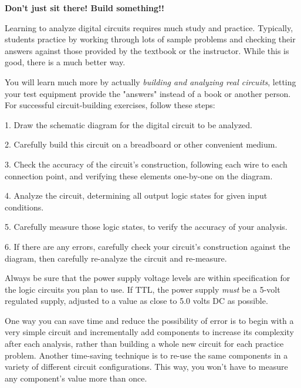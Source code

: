 

\centerline{\bf Don't just sit there!  Build something!!}

\vskip 10pt

Learning to analyze digital circuits requires much study and practice.  Typically, students practice by working through lots of sample problems and checking their answers against those provided by the textbook or the instructor.  While this is good, there is a much better way.

You will learn much more by actually {\it building and analyzing real circuits}, letting your test equipment provide the "answers" instead of a book or another person.  For successful circuit-building exercises, follow these steps:

\medskip
\item{1.} Draw the schematic diagram for the digital circuit to be analyzed.
\item{2.} Carefully build this circuit on a breadboard or other convenient medium.
\item{3.} Check the accuracy of the circuit's construction, following each wire to each connection point, and verifying these elements one-by-one on the diagram.
\item{4.} Analyze the circuit, determining all output logic states for given input conditions.
\item{5.} Carefully measure those logic states, to verify the accuracy of your analysis.
\item{6.} If there are any errors, carefully check your circuit's construction against the diagram, then carefully re-analyze the circuit and re-measure.
\medskip

Always be sure that the power supply voltage levels are within specification for the logic circuits you plan to use.  If TTL, the power supply {\it must} be a 5-volt regulated supply, adjusted to a value as close to 5.0 volts DC as possible.

One way you can save time and reduce the possibility of error is to begin with a very simple circuit and incrementally add components to increase its complexity after each analysis, rather than building a whole new circuit for each practice problem.  Another time-saving technique is to re-use the same components in a variety of different circuit configurations.  This way, you won't have to measure any component's value more than once.

